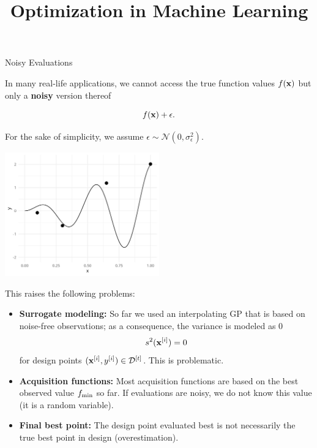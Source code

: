 \documentclass[11pt,compress,t,notes=noshow, xcolor=table]{beamer}
\title{Optimization in Machine Learning}
\date{}
\begin{document}


\begin{vbframe}{Noisy Evaluations}

In many real-life applications, we cannot access the true function values $f(\mathbf{x})$ but only a \textbf{noisy} version thereof

$$
  f(\mathbf{x}) + \epsilon. 
$$

For the sake of simplicity, we assume $\epsilon \sim \mathcal{N}\left(0, \sigma_\epsilon^2\right)$.

\begin{center}
  \includegraphics[width = 0.5\textwidth]{figure_man/noisy_0.png}
\end{center}

\framebreak 


This raises the following problems: 

\begin{itemize}
  \item \textbf{Surrogate modeling:} So far we used an interpolating GP that is based on noise-free observations; as a consequence, the variance is modeled as $0$
  $$
    s^2(\mathbf{x}^{[i]}) = 0
  $$
  for design points $(\mathbf{x}^{[i]}, y^{[i]}) \in \mathcal{D}^{[t]}$. This is problematic. 
  \item \textbf{Acquisition functions:} Most acquisition functions are based on the best observed value $f_{\min}$ so far. If evaluations are noisy, we do not know this value (it is a random variable).
  \item \textbf{Final best point:} The design point evaluated best is not necessarily the true best point in design (overestimation). 
\end{itemize}


\end{vbframe}
\end{document}
